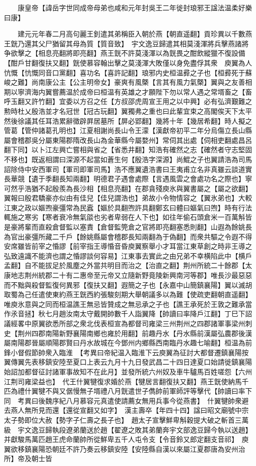 　　康皇帝【諱岳字世同成帝母弟也咸和元年封吳王二年徙封琅邪王諡法温柔好樂曰康】

　　建元元年春二月高句麗王釗遣其弟稱臣入朝於燕【朝直遥翻】貢珍異以千數燕王皝乃還其父尸猶留其母為質【質音致】　宇文逸豆歸遣其相莫淺渾將兵擊燕諸將争欲擊之【相息亮翻將即亮翻】燕王皝不許莫淺渾以為皝畏之酣飲縱獵不復設備【酣戶甘翻復扶又翻】皝使慕容翰出擊之莫淺渾大敗僅以身免盡俘其衆　庾翼為人忼慨【忼慨同音口黨翻】喜功名【喜許記翻】琅邪内史桓温彛之子也【桓彛死于蘇峻之難】尚南康公主【公主明帝女】豪爽有風槩【言其有風力氣槩】翼與之友善相期以寧濟海内翼嘗薦温於成帝曰桓温有英雄之才願陛下勿以常人遇之常壻畜之【畜呼玉翻又許竹翻】宜委以方召之任【方叔邵虎周宣王用之以中興】必有弘濟艱難之勲時杜乂殷浩並才名冠世【冠古玩翻】翼獨弗之重也曰此輩宜束之高閣俟天下太平然後徐議其任耳浩累辭徵辟屛居墓所【屏必郢翻】幾將十年【幾居希翻】時人擬之管葛【管仲諸葛孔明也】江夏相謝尚長山令王濛【漢獻帝初平二年分烏傷立長山縣屬會稽郡吳分屬東陽郡隋改長山為金華縣今屬婺州】常伺其出處【伺相吏翻處昌呂翻下同】以卜江左興亡嘗相與省之【省悉井翻】知浩有確然之志【確然者守志堅固不移也】既返相謂曰深源不起當如蒼生何【殷浩字深源】尚鯤之子也翼請浩為司馬詔除侍中安西軍司【軍司即軍司馬】浩不應翼遺浩書曰王夷甫立名非真雖云談道實長華競【遺于季翻長知兩翻】明德君子遇會處際【言遇風雲之會處功名之際也】寧可然乎浩猶不起殷羨為長沙相【相息亮翻】在郡貪殘庾氷與翼書屬之【屬之欲翻】翼報曰殷君驕豪亦似由有佳兒【佳兒謂浩也】弟故小令物情容之【翼氷弟也】大較江東之政以嫗喣豪彊常為民蠧【嫗於具翻喣許具翻鄭玄曰體曰嫗氣曰喣】時有行法輒施之寒劣【寒者衰冷無氣燄也劣者卑弱在人下也】如往年偷石頭倉米一百萬斛皆是豪將輩而直殺倉督監以塞責【倉督監筦倉之官將即亮翻塞悉則翻】山遐為餘姚長為官出豪彊所藏二千戶【餘姚縣屬會稽郡長知兩翻為于偽翻】而衆共驅之令遐不得安席雖皆前宰之惛謬【前宰指王導惛音昏庾翼察舉小才耳當江東草創之時非王導之弘致遠識不能濟也謂之惛謬談何容易】江東事去實此之由兄弟不幸横陷此中【横戶孟翻】自不能拔足於風塵之外當共明目而治之【治直之翻】荆州所統二十餘郡【太康地志荆州統郡二十有二惠帝至元帝又立隨新野竟陵新興南河等郡】唯長沙最惡惡而不黜與殺督監復何異邪【復扶又翻】遐簡之子也【永嘉中山簡鎮襄陽】翼以滅胡取蜀為己任遣使東約燕王皝西約張駿刻期大舉朝議多以為難【使疏吏翻朝直遥翻】唯庾氷意與之同而桓温譙王無忌皆贊成之無忌承之子也【譙王承死於王敦之難承當作氶音拯】秋七月趙汝南太守戴開帥數千人詣翼降【帥讀曰率降戶江翻】丁巳下詔議經畧中原翼欲悉所部之衆北伐表桓宣為都督司雍梁三州荆州之四郡諸軍事梁州刺史【荆州四郡南陽新野襄陽南鄉也雍於用翻】前趣丹水【丹水縣前漢屬弘農郡後漢屬南陽郡晉屬順陽郡賢曰丹水故城在今鄧州内鄉縣西南臨丹水趣七喻翻】桓温為前鋒小督假節帥衆入臨淮　【考異曰帝紀温入臨淮下云庾翼為征討大都督遷鎮襄陽按翼傳翼先表移鎮安陸至夏口上表云九月十九日發武昌二十四日達夏口始請徙鎮襄陽始詔加都督征討諸軍事故知不在此月】並發所統六州奴及車牛驢馬百姓嗟怨【六州江荆司雍梁益也】　代王什翼犍復求婚於燕【犍居言翻復扶又翻】燕王皝使納馬千匹為禮什翼犍不與又倨慢無子壻禮八月皝遣世子儁帥前軍師評等擊代【帥讀曰率下同　考異曰後魏序紀八月慕容元真遣使請薦女無用兵事今從燕書】　什翼犍帥衆避去燕人無所見而還【還從宣翻又如字】　漢主壽卒【年四十四】諡曰昭文廟號中宗太子勢即位大赦【勢字子仁壽之長子也】　趙太子宣擊鮮卑斛穀提大破之斬首三萬級　宇文逸豆歸執段遼弟蘭送於趙【翟遼之敗其弟蘭奔宇文部逸豆歸今執以送趙】并獻駿馬萬匹趙王虎命蘭帥所從鮮卑五千人屯令支【令音鈴又郎定翻支音祁】　庾翼欲移鎮襄陽恐朝廷不許乃奏云移鎮安陸【安陸縣自漢以來屬江夏郡唐為安州治所】帝及朝士皆